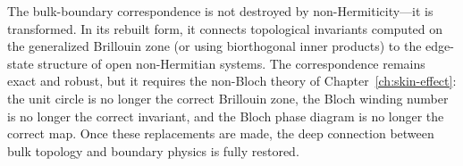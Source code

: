 \begin{takeaway}
The bulk-boundary correspondence is not destroyed by non-Hermiticity---it
is transformed. In its rebuilt form, it connects topological invariants
computed on the generalized Brillouin zone (or using biorthogonal inner
products) to the edge-state structure of open non-Hermitian systems.
The correspondence remains exact and robust, but it requires the non-Bloch
theory of Chapter~\ref{ch:skin-effect}: the unit circle is no longer the
correct Brillouin zone, the Bloch winding number is no longer the correct
invariant, and the Bloch phase diagram is no longer the correct map.
Once these replacements are made, the deep connection between bulk
topology and boundary physics is fully restored.
\end{takeaway}
